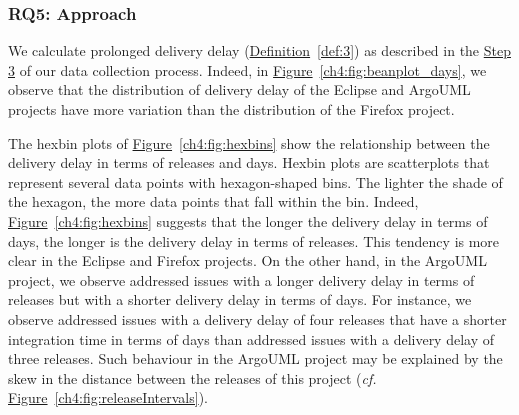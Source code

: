 \subsubsection*{RQ5: Approach} We calculate prolonged delivery delay
(\hyperref[def:3]{Definition}~\ref{def:3}) as
described in the \hyperref[settings:step3]{Step 3} of our data collection
process. Indeed, in
\hyperref[ch4:fig:beanplot_days]{Figure}~\ref{ch4:fig:beanplot_days}, we observe that
the distribution of delivery delay of the Eclipse and ArgoUML projects have more variation than
the distribution of the Firefox project.

The hexbin plots of \hyperref[ch4:fig:hexbins]{Figure}~\ref{ch4:fig:hexbins} show the
relationship between the delivery delay in terms of releases and days. Hexbin
plots are scatterplots that represent several data points with hexagon-shaped
bins. The lighter the shade of the hexagon, the more data points that fall
within the bin. Indeed, \hyperref[ch4:fig:hexbins]{Figure}~\ref{ch4:fig:hexbins}
suggests that the longer the delivery delay in terms of days, the longer is
the delivery delay in terms of releases. This tendency is more clear in the
Eclipse and Firefox projects. On the other hand, in the ArgoUML project, we
observe addressed issues with a longer delivery delay in terms of releases but
with a shorter delivery delay in terms of days. For instance, we observe addressed
issues with a delivery delay of four releases that have a shorter integration
time in terms of days than addressed issues with a delivery delay of three
releases.  Such behaviour in the ArgoUML project may be explained by the skew in
the distance between the releases of this project ({\em cf.}
\hyperref[ch4:fig:releaseIntervals]{Figure}~\ref{ch4:fig:releaseIntervals}).

